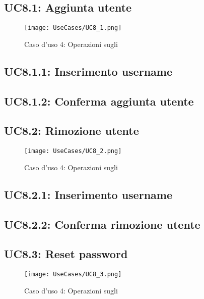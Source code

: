 \documentclass{scalatekids-article}
\begin{document}
\subsection{UC8.1: Aggiunta utente}

\begin{figure}[H]
  \begin{center}
    \texttt{[image: UseCases/UC8\_1.png]}
    \caption*{Caso d'uso 4: Operazioni sugli }
  \end{center}
\end{figure}

\subsection{UC8.1.1: Inserimento username}

\subsection{UC8.1.2: Conferma aggiunta utente}

\subsection{UC8.2: Rimozione utente}

\begin{figure}[H]
  \begin{center}
    \texttt{[image: UseCases/UC8\_2.png]}
    \caption*{Caso d'uso 4: Operazioni sugli }
  \end{center}
\end{figure}

\subsection{UC8.2.1: Inserimento username}

\subsection{UC8.2.2: Conferma rimozione utente}

\subsection{UC8.3: Reset password}

\begin{figure}[H]
  \begin{center}
    \texttt{[image: UseCases/UC8\_3.png]}
    \caption*{Caso d'uso 4: Operazioni sugli }
  \end{center}
\end{figure}
\end{document}
